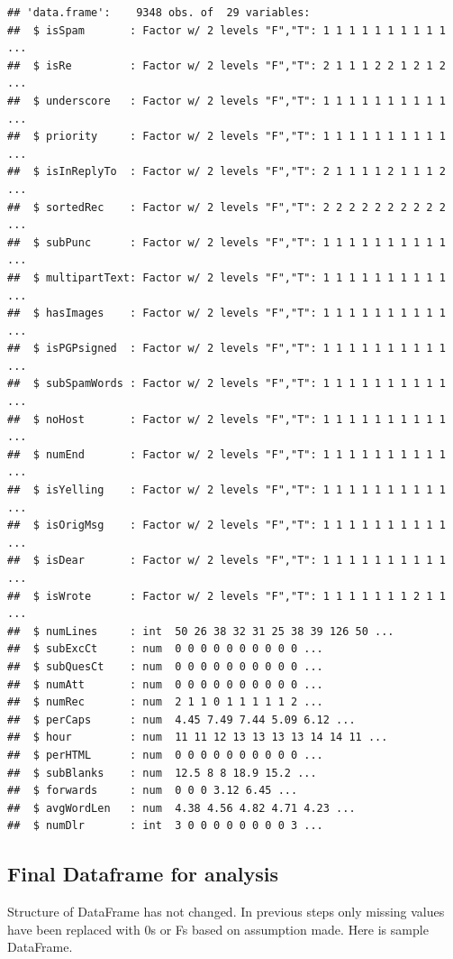 \documentclass[
]{article}
\begin{document}
\begin{verbatim}
## 'data.frame':    9348 obs. of  29 variables:
##  $ isSpam       : Factor w/ 2 levels "F","T": 1 1 1 1 1 1 1 1 1 1 ...
##  $ isRe         : Factor w/ 2 levels "F","T": 2 1 1 1 2 2 1 2 1 2 ...
##  $ underscore   : Factor w/ 2 levels "F","T": 1 1 1 1 1 1 1 1 1 1 ...
##  $ priority     : Factor w/ 2 levels "F","T": 1 1 1 1 1 1 1 1 1 1 ...
##  $ isInReplyTo  : Factor w/ 2 levels "F","T": 2 1 1 1 1 2 1 1 1 2 ...
##  $ sortedRec    : Factor w/ 2 levels "F","T": 2 2 2 2 2 2 2 2 2 2 ...
##  $ subPunc      : Factor w/ 2 levels "F","T": 1 1 1 1 1 1 1 1 1 1 ...
##  $ multipartText: Factor w/ 2 levels "F","T": 1 1 1 1 1 1 1 1 1 1 ...
##  $ hasImages    : Factor w/ 2 levels "F","T": 1 1 1 1 1 1 1 1 1 1 ...
##  $ isPGPsigned  : Factor w/ 2 levels "F","T": 1 1 1 1 1 1 1 1 1 1 ...
##  $ subSpamWords : Factor w/ 2 levels "F","T": 1 1 1 1 1 1 1 1 1 1 ...
##  $ noHost       : Factor w/ 2 levels "F","T": 1 1 1 1 1 1 1 1 1 1 ...
##  $ numEnd       : Factor w/ 2 levels "F","T": 1 1 1 1 1 1 1 1 1 1 ...
##  $ isYelling    : Factor w/ 2 levels "F","T": 1 1 1 1 1 1 1 1 1 1 ...
##  $ isOrigMsg    : Factor w/ 2 levels "F","T": 1 1 1 1 1 1 1 1 1 1 ...
##  $ isDear       : Factor w/ 2 levels "F","T": 1 1 1 1 1 1 1 1 1 1 ...
##  $ isWrote      : Factor w/ 2 levels "F","T": 1 1 1 1 1 1 1 2 1 1 ...
##  $ numLines     : int  50 26 38 32 31 25 38 39 126 50 ...
##  $ subExcCt     : num  0 0 0 0 0 0 0 0 0 0 ...
##  $ subQuesCt    : num  0 0 0 0 0 0 0 0 0 0 ...
##  $ numAtt       : num  0 0 0 0 0 0 0 0 0 0 ...
##  $ numRec       : num  2 1 1 0 1 1 1 1 1 2 ...
##  $ perCaps      : num  4.45 7.49 7.44 5.09 6.12 ...
##  $ hour         : num  11 11 12 13 13 13 13 14 14 11 ...
##  $ perHTML      : num  0 0 0 0 0 0 0 0 0 0 ...
##  $ subBlanks    : num  12.5 8 8 18.9 15.2 ...
##  $ forwards     : num  0 0 0 3.12 6.45 ...
##  $ avgWordLen   : num  4.38 4.56 4.82 4.71 4.23 ...
##  $ numDlr       : int  3 0 0 0 0 0 0 0 0 3 ...
\end{verbatim}

\hypertarget{final-dataframe-for-analysis}{%
\subsection{Final Dataframe for
analysis}\label{final-dataframe-for-analysis}}

Structure of DataFrame has not changed. In previous steps only missing
values have been replaced with 0s or Fs based on assumption made. Here
is sample DataFrame.
\end{document}
